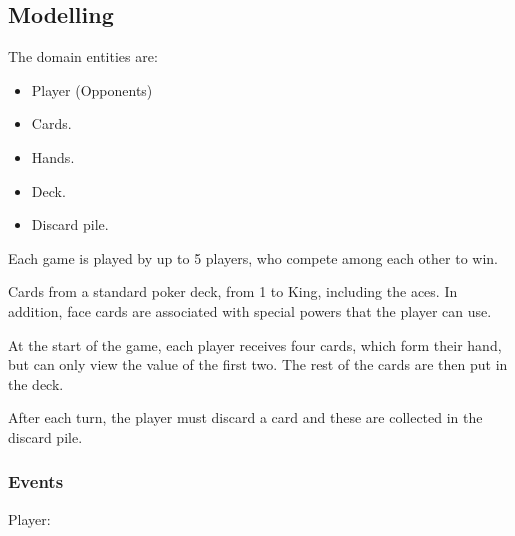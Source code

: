 \documentclass{scrartcl}
\begin{document}
\subsection{Modelling}\label{modelling}

The domain entities are:

\begin{itemize}
    \item Player (Opponents)
    
    \item Cards.

    \item Hands.

    \item Deck.

    \item Discard pile.
\end{itemize}

Each game is played by up to 5 players, who compete among each other to win.

Cards from a standard poker deck, from 1 to King, including the aces.
%
In addition, face cards are associated with special powers that the player can use.

At the start of the game, each player receives four cards, which form their hand, but can only view the value of the first two.
%
The rest of the cards are then put in the deck.

After each turn, the player must discard a card and these are collected in the discard pile.

\subsubsection{Events}

Player:
\end{document}
